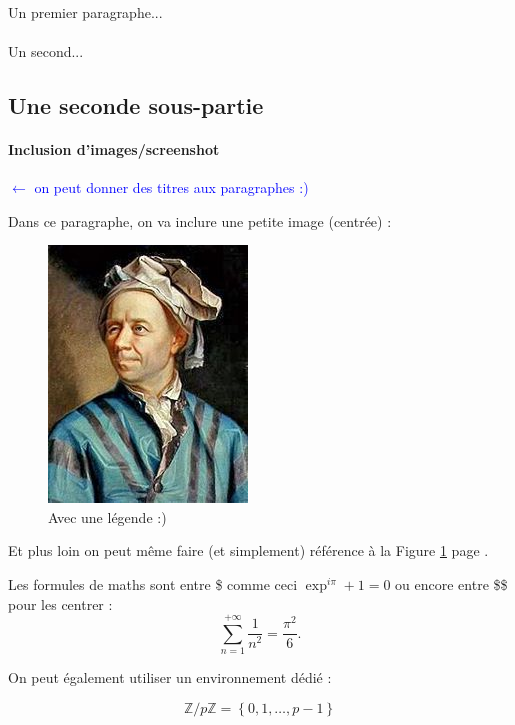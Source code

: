 \documentclass[a4paper, 12pt]{article}
\begin{document}
\paragraph{}
Un premier paragraphe...
\paragraph{}
Un second...

\subsection{Une seconde sous-partie}
\paragraph{Inclusion d'images/screenshot} \textcolor{blue}{$\leftarrow$ on peut donner des titres aux paragraphes :)} 

Dans ce paragraphe, on va inclure une petite image (centrée) :

\begin{figure}[h]
\centering
\includegraphics[scale=.5]{images/euler.jpg}
\caption{\label{euler}Avec une légende :)}
\end{figure}

Et plus loin on peut même faire (et simplement) référence à la Figure \ref{euler} page \pageref{euler}.

Les formules de maths sont entre \$ comme ceci $\exp^{i\pi} + 1 = 0$ ou encore entre \$\$ pour les centrer : $$\sum_{n=1}^{+\infty} \frac{1}{n^2} = \frac{\pi^2}{6}.$$

On peut également utiliser un environnement dédié :

\begin{equation}
\label{eq:zsurpz}
\mathbb{Z}/p\mathbb{Z} = \left\lbrace 0, 1, \ldots, p-1  \right\rbrace
\end{equation}
\end{document}
